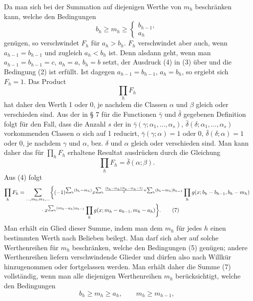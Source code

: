 \documentclass[11pt,a4paper]{article}
\begin{document}
Da man sich bei der Summation auf diejenigen Werthe von $m_h$ beschränken kann, welche den Bedingungen
\begin{equation}
 b_h\ge m_h\ge\begin{cases}b_{h-1},\\ a_h
 \end{cases}
\tag{5}
\end{equation}
genügen, so verschwindet $F_h$ für $a_h>b_h$. $F_h$ verschwindet aber auch, wenn $a_{h-1}=b_{h-1}$ und zugleich $a_h<b_h$ ist. Denn alsdann geht, wenn man $a_{h-1}=b_{h-1}=c$, $a_h=a$, $b_h=b$ setzt, der Ausdruck (4) in (3) über und die Bedingung (2) ist erfüllt. Ist dagegen $a_{h-1}=b_{h-1}$, $a_h=b_h$, so ergiebt sich $F_h=1$. Das Product
\[
 \prod_hF_h
\]
hat daher den Werth 1 oder 0, je nachdem die Classen $\alpha$ und $\beta$ gleich oder verschieden sind. Aus der in § 7 für die Functionen $\bar\gamma$ und $\bar\delta$ gegebenen Definition folgt für den Fall, dass die Anzahl $s$ der in $\bar\gamma(\gamma;\alpha_1,\ldots,\alpha_s)$, $\bar\delta(\delta;\alpha_1,
\ldots,\alpha_s)$ vorkommenden Classen $\alpha$ sich auf 1 reducirt, $\bar\gamma(\gamma;\alpha)=1$ oder $0$, $\bar\delta(\delta;\alpha)=1$ oder $0$, je nachdem $\gamma$ und $\alpha$, bez. $\delta$ und $\alpha$ gleich oder verschieden sind. Man kann daher das für $\prod_hF_h$ erhaltene Resultat ausdrücken durch die Gleichung
\begin{equation}
 \prod_hF_h=\bar\delta(\alpha;\beta).
\tag{6}
\end{equation}
Aus (4) folgt
\begin{align}
\prod_hF_h
&=\sum_{\ldots,m_0,m_1,\ldots}
\biggl\{(-1)^{\sum_h(b_h-m_h)}
 x^{\sum_h{(b_h-m_h)(b_h-m_h-1)\over2}+\sum_h(b_h-m_h)b_{h-1}}
 \prod_h g(x;b_h-b_{h-1},b_h-m_h)\notag\\
&\qquad\qquad\cdot
 x^{\sum_h(m_h-a_h)a_{h-1}}
 \prod_h g(x;m_h-a_{h-1},m_h-a_h)\biggr\}.
\tag{7}
\end{align}
Man erhält ein Glied dieser Summe, indem man dem $m_h$ für jedes $h$ einen bestimmten Werth nach Belieben beilegt. Man darf sich aber auf solche Werthenreihen für $m_h$ beschränken, welche den Bedingungen (5) genügen; andere Werthenreihen liefern verschwindende Glieder und dürfen also nach Willkür hinzugenommen oder fortgelassen werden. Man erhält daher die Summe (7) vollständig, wenn man alle diejenigen Werthenreihen $m_h$ berücksichtigt, welche den Bedingungen
\begin{equation}
 b_h\ge m_h\ge a_h,
 \qquad m_h\ge m_{h-1},
\tag{8}
\end{equation}
\end{document}

